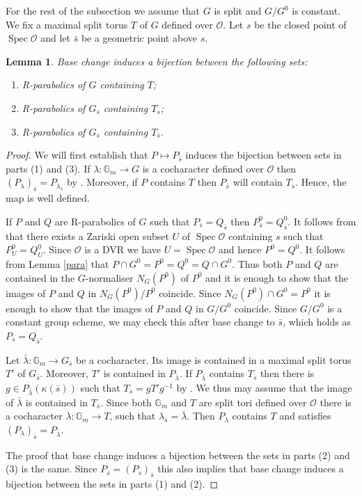 \documentclass{amsart}
\newtheorem{lem}[prop]{Lemma}
\theoremstyle{definition}
\theoremstyle{remark}
\DeclareMathOperator{\Spec}{Spec}
\newcommand{\OO}{\mathcal O}
\newcommand{\Gm}{\mathbb G_{m}}
\newcommand{\sbar}{\bar{s}}
\newcommand{\lambdabar}{\bar{\lambda}}
\begin{document}
For the rest of the subsection we assume that $G$ is split and $G/G^0$ is constant. We fix a maximal split torus $T$ of $G$ defined over $\OO$. Let $s$ be the closed point of 
$\Spec \OO$ and let $\sbar$ be a geometric point above $s$. 

\begin{lem}\label{base_change_R_par} Base change induces a bijection between the following sets:
\begin{enumerate}
\item R-parabolics of $G$ containing $T$;
\item R-parabolics of $G_s$ containing $T_s$;
\item R-parabolics of $G_{\sbar}$ containing $T_{\sbar}$.
\end{enumerate}

\end{lem}
\begin{proof} We will first establish that $P\mapsto P_{\sbar}$ induces the bijection between sets in parts (1) and  (3). If $\lambda: \Gm \rightarrow G$ is a cocharacter defined over $\OO$ then 
$(P_{\lambda})_{\sbar} = P_{\lambda_{\sbar}}$
by \cite[Lemma 2.1.4]{CGP}. Moreover, if $P$ contains $T$ then $P_{\sbar}$ will contain $T_{\sbar}$. Hence, the map is well defined. 

If $P$ and $Q$ are R-parabolics of $G$ such that $P_{\sbar}=Q_{\sbar}$ then $P^0_{\sbar}=Q^0_{\sbar}$. 
It follows from \cite[Corollary 5.2.7 (2)]{bcnrd} 
that there exists a Zariski open subset $U$ of $\Spec 
\OO$ containing $s$ such that $P^0_U = Q^0_U$. 
Since $\OO$ is a DVR we have $U=\Spec \OO$ and hence $P^0=Q^0$. It follows from Lemma \ref{para} 
that $P\cap G^0= P^0=Q^0= Q\cap G^0$. Thus both $P$ and $Q$ are contained in the $G$-normaliser $N_G(P^0)$ of $P^0$
and it is enough to show that the images of $P$ and $Q$ in $N_G(P^0)/P^0$ coincide. Since $N_G(P^0)\cap G^0 = P^0$ 
it is 
enough to show that the images of $P$ and $Q$ in 
$G/G^0$ coincide. Since $G/G^0$ is a constant group scheme, we may check this after base change to $\sbar$, which holds as $P_{\sbar}=Q_{\sbar}$. 

Let $\lambdabar: \Gm\rightarrow G_{\sbar}$ be a 
cocharacter. Its image is contained in a maximal 
split torus  $T'$ of $G_{\sbar}$.
Moreover, $T'$ is contained in $P_{\lambdabar}$. If $P_{\lambdabar}$ 
contains $T_{\sbar}$ then there is 
$g\in P_{\lambdabar}(\kappa(\sbar))$ 
such that $T_{\sbar}= g T' g^{-1}$ by \cite[Proposition 11.19]{borel}. 
We thus may assume that the image of 
$\lambdabar$ is contained in $T_{\sbar}$. Since 
both $\Gm$ and $T$ are split tori defined over $\OO$ there is a cocharacter $\lambda: \Gm\rightarrow T$, such that $\lambda_{\sbar}=\lambdabar$. Then 
$P_{\lambda}$ contains $T$ and satisfies $(P_{\lambda})_{\sbar} = P_{\lambdabar}$. 

The proof that base change induces a bijection between the sets in parts (2) and (3) is the same. Since
$P_{\sbar}= (P_s)_{\sbar}$ this also implies that base change induces a bijection between 
the sets in parts (1) and (2).
\end{proof}
\end{document}
